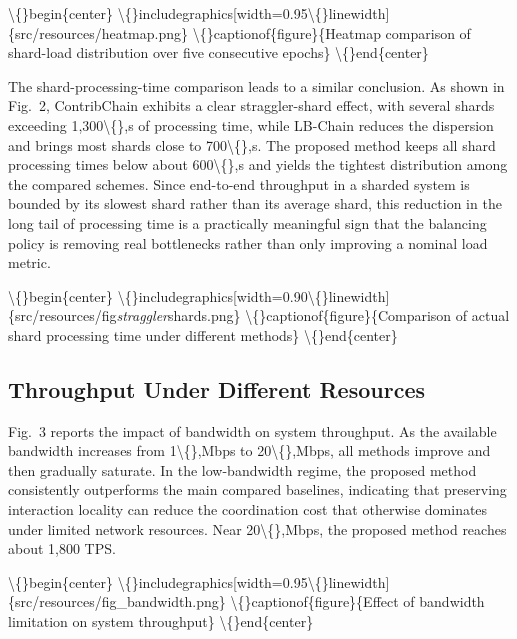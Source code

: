 \documentclass{article}
\begin{document}
\textbackslash\{\}begin\{center\}
    \textbackslash\{\}includegraphics[width=0.95\textbackslash\{\}linewidth]\{src/resources/heatmap.png\}
    \textbackslash\{\}captionof\{figure\}\{Heatmap comparison of shard-load distribution over five consecutive epochs\}
\textbackslash\{\}end\{center\}

The shard-processing-time comparison leads to a similar conclusion. As shown in Fig.~2, ContribChain exhibits a clear straggler-shard effect, with several shards exceeding 1,300\textbackslash\{\},s of processing time, while LB-Chain reduces the dispersion and brings most shards close to 700\textbackslash\{\},s. The proposed method keeps all shard processing times below about 600\textbackslash\{\},s and yields the tightest distribution among the compared schemes. Since end-to-end throughput in a sharded system is bounded by its slowest shard rather than its average shard, this reduction in the long tail of processing time is a practically meaningful sign that the balancing policy is removing real bottlenecks rather than only improving a nominal load metric.

\textbackslash\{\}begin\{center\}
    \textbackslash\{\}includegraphics[width=0.90\textbackslash\{\}linewidth]\{src/resources/fig\emph{straggler}shards.png\}
    \textbackslash\{\}captionof\{figure\}\{Comparison of actual shard processing time under different methods\}
\textbackslash\{\}end\{center\}

\subsection{Throughput Under Different Resources}\label{sec:throughput-under-different-resources}

Fig.~3 reports the impact of bandwidth on system throughput. As the available bandwidth increases from 1\textbackslash\{\},Mbps to 20\textbackslash\{\},Mbps, all methods improve and then gradually saturate. In the low-bandwidth regime, the proposed method consistently outperforms the main compared baselines, indicating that preserving interaction locality can reduce the coordination cost that otherwise dominates under limited network resources. Near 20\textbackslash\{\},Mbps, the proposed method reaches about 1,800 TPS.

\textbackslash\{\}begin\{center\}
    \textbackslash\{\}includegraphics[width=0.95\textbackslash\{\}linewidth]\{src/resources/fig\_bandwidth.png\}
    \textbackslash\{\}captionof\{figure\}\{Effect of bandwidth limitation on system throughput\}
\textbackslash\{\}end\{center\}
\end{document}

